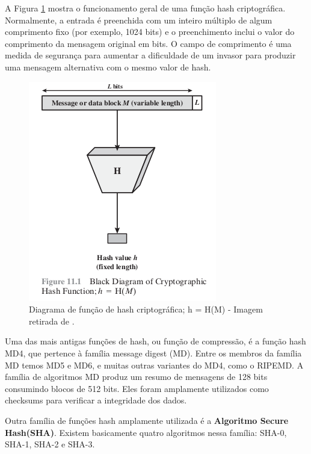         A Figura \ref{fig:hash_function} mostra o funcionamento geral de uma função hash criptográfica. Normalmente, a entrada é preenchida com um inteiro múltiplo de algum comprimento fixo (por exemplo, 1024 bits) e o preenchimento inclui o valor do comprimento da mensagem original em bits. O campo de comprimento é uma medida de segurança para aumentar a dificuldade de um invasor para produzir uma mensagem alternativa com o mesmo valor de hash.\cite{cryptograpy_and_network_stallings}
    
                \begin{figure}[H]
                     \centering
                     \includegraphics[scale=0.5]{figuras/capitulo_2/hash_function.png}
                     \caption{Diagrama de função de hash criptográfica; h = H(M) - Imagem retirada de \cite{cryptograpy_and_network_stallings}.}
                     \label{fig:hash_function}
                \end{figure}
                
        Uma das mais antigas funções de hash, ou função de compressão, é a função hash MD4, que pertence à família message digest (MD). Entre os membros da família MD temos MD5 e MD6, e muitas outras variantes do MD4, como o RIPEMD. A família de algoritmos MD produz um resumo de mensagens de 128 bits consumindo blocos de 512 bits. Eles foram amplamente utilizados como checksums para verificar a integridade dos dados.\cite{beginnig_blockchain_bikramaditya}
        
        Outra família de funções hash amplamente utilizada é a \textbf{Algoritmo Secure Hash(SHA)}. Existem basicamente quatro algoritmos nessa família: SHA-0, SHA-1, SHA-2 e SHA-3. \cite{beginnig_blockchain_bikramaditya}

